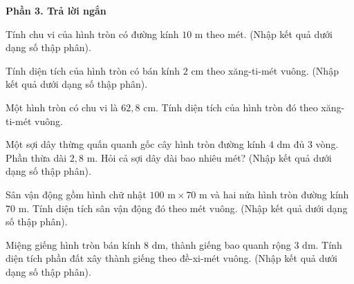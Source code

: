 \textbf{Phần 3. Trả lời ngắn}

\begin{ex} %
Tính chu vi của hình tròn có đường kính $10\text{ m}$ theo mét. (Nhập kết quả dưới dạng số thập phân).
\end{ex}

\begin{ex} %
Tính diện tích của hình tròn có bán kính $2\text{ cm}$ theo xăng-ti-mét vuông. (Nhập kết quả dưới dạng số thập phân).
\end{ex}

\begin{ex} %
Một hình tròn có chu vi là $62{,}8\text{ cm}$. Tính diện tích của hình tròn đó theo xăng-ti-mét vuông.
\end{ex}

\begin{ex} %
Một sợi dây thừng quấn quanh gốc cây hình tròn đường kính $4\text{ dm}$ đủ $3$ vòng. Phần thừa dài $2{,}8\text{ m}$. Hỏi cả sợi dây dài bao nhiêu mét? (Nhập kết quả dưới dạng số thập phân).
\end{ex}

\begin{ex} %
Sân vận động gồm hình chữ nhật $100\text{ m} \times 70\text{ m}$ và hai nửa hình tròn đường kính $70\text{ m}$. Tính diện tích sân vận động đó theo mét vuông. (Nhập kết quả dưới dạng số thập phân).
\end{ex}

\begin{ex} %
Miệng giếng hình tròn bán kính $8\text{ dm}$, thành giếng bao quanh rộng $3\text{ dm}$. Tính diện tích phần đất xây thành giếng theo đề-xi-mét vuông. (Nhập kết quả dưới dạng số thập phân).
\end{ex}
